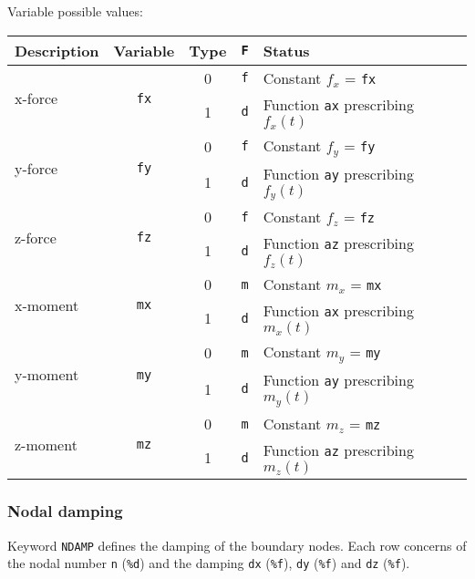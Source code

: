 Variable possible values:

\begin{tabular}{|l|c|c|c|l|}
\hline
{\bf Description} & {\bf Variable} & {\bf Type} & \texttt{\bf F} & {\bf Status} \\ \hline
\multirow{2}{*}{x-force} & \multirow{2}{*}{\texttt{fx}} & 0 & \texttt{f} & Constant $f_x$ = \texttt{fx} \\ \cline{3-5}
& & 1 & \texttt{d} & Function \texttt{ax} prescribing $f_x(t)$ \\ \hline
\multirow{2}{*}{y-force} & \multirow{2}{*}{\texttt{fy}} & 0 & \texttt{f} & Constant $f_y$ = \texttt{fy} \\ \cline{3-5}
& & 1 & \texttt{d} & Function \texttt{ay} prescribing $f_y(t)$ \\ \hline
\multirow{2}{*}{z-force} & \multirow{2}{*}{\texttt{fz}} & 0 & \texttt{f} & Constant $f_z$ = \texttt{fz} \\ \cline{3-5}
& & 1 & \texttt{d} & Function \texttt{az} prescribing $f_z(t)$ \\ \hline
\multirow{2}{*}{x-moment} & \multirow{2}{*}{\texttt{mx}} & 0 & \texttt{m} & Constant $m_x$ = \texttt{mx} \\ \cline{3-5}
& & 1 & \texttt{d} & Function \texttt{ax} prescribing $m_x(t)$ \\ \hline
\multirow{2}{*}{y-moment} & \multirow{2}{*}{\texttt{my}} & 0 & \texttt{m} & Constant $m_y$ = \texttt{my} \\ \cline{3-5}
& & 1 & \texttt{d} & Function \texttt{ay} prescribing $m_y(t)$ \\ \hline
\multirow{2}{*}{z-moment} & \multirow{2}{*}{\texttt{mz}} & 0 & \texttt{m} & Constant $m_z$ = \texttt{mz} \\ \cline{3-5}
& & 1 & \texttt{d} & Function \texttt{az} prescribing $m_z(t)$ \\ \hline
\end{tabular}

\newpage


\subsubsection{Nodal damping}

Keyword \texttt{NDAMP} defines the damping of the boundary nodes. Each row concerns of the nodal number \texttt{n} (\texttt{\%d}) and the damping \texttt{dx} (\texttt{\%f}), \texttt{dy} (\texttt{\%f}) and \texttt{dz} (\texttt{\%f}).

